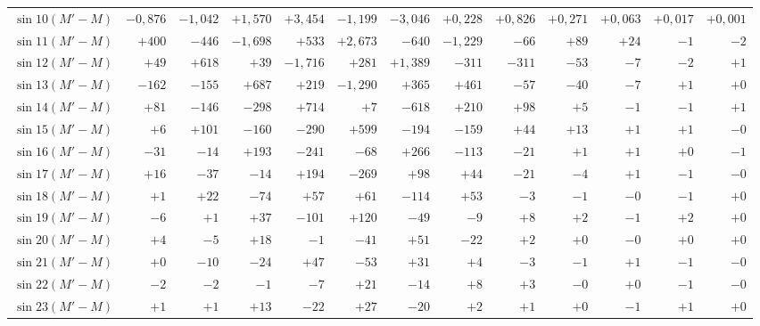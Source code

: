 \begin{landscape}
\begin{longtable}{@{}l|r|r|r|r|r|r|r|r|r|r|r|r@{}}
\(\sin 10(M'-M)\) & \(-0{,}876\) & \(-1{,}042\) & \(+1{,}570\) & \(+3{,}454\) & \(-1{,}199\) & \(-3{,}046\) & \(+0{,}228\) & \(+0{,}826\) & \(+0{,}271\) & \(+0{,}063\) & \(+0{,}017\) & \(+0{,}001\)\\
\(\sin 11(M'-M)\) & \(+400\) & \(-446\) & \(-1{,}698\) & \(+533\) & \(+2{,}673\) & \(-640\) & \(-1{,}229\) & \(-66\) & \(+89\) & \(+24\) & \(-1\) & \(-2\)\\
\(\sin 12(M'-M)\) & \(+49\) & \(+618\) & \(+39\) & \(-1{,}716\) & \(+281\) & \(+1{,}389\) & \(-311\) & \(-311\) & \(-53\) & \(-7\) & \(-2\) & \(+1\)\\
\(\sin 13(M'-M)\) & \(-162\) & \(-155\) & \(+687\) & \(+219\) & \(-1{,}290\) & \(+365\) & \(+461\) & \(-57\) & \(-40\) & \(-7\) & \(+1\) & \(+0\)\\
\(\sin 14(M'-M)\) & \(+81\) & \(-146\) & \(-298\) & \(+714\) & \(+7\) & \(-618\) & \(+210\) & \(+98\) & \(+5\) & \(-1\) & \(-1\) & \(+1\)\\
\(\sin 15(M'-M)\) & \(+6\) & \(+101\) & \(-160\) & \(-290\) & \(+599\) & \(-194\) & \(-159\) & \(+44\) & \(+13\) & \(+1\) & \(+1\) & \(-0\)\\
\(\sin 16(M'-M)\) & \(-31\) & \(-14\) & \(+193\) & \(-241\) & \(-68\) & \(+266\) & \(-113\) & \(-21\) & \(+1\) & \(+1\) & \(+0\) & \(-1\)\\
\(\sin 17(M'-M)\) & \(+16\) & \(-37\) & \(-14\) & \(+194\) & \(-269\) & \(+98\) & \(+44\) & \(-21\) & \(-4\) & \(+1\) & \(-1\) & \(-0\)\\
\(\sin 18(M'-M)\) & \(+1\) & \(+22\) & \(-74\) & \(+57\) & \(+61\) & \(-114\) & \(+53\) & \(-3\) & \(-1\) & \(-0\) & \(-1\) & \(+0\)\\
\(\sin 19(M'-M)\) & \(-6\) & \(+1\) & \(+37\) & \(-101\) & \(+120\) & \(-49\) & \(-9\) & \(+8\) & \(+2\) & \(-1\) & \(+2\) & \(+0\)\\
\(\sin 20(M'-M)\) & \(+4\) & \(-5\) & \(+18\) & \(-1\) & \(-41\) & \(+51\) & \(-22\) & \(+2\) & \(+0\) & \(-0\) & \(+0\) & \(+0\)\\
\(\sin 21(M'-M)\) & \(+0\) & \(-10\) & \(-24\) & \(+47\) & \(-53\) & \(+31\) & \(+4\) & \(-3\) & \(-1\) & \(+1\) & \(-1\) & \(-0\)\\
\(\sin 22(M'-M)\) & \(-2\) & \(-2\) & \(-1\) & \(-7\) & \(+21\) & \(-14\) & \(+8\) & \(+3\) & \(-0\) & \(+0\) & \(-1\) & \(-0\)\\
\(\sin 23(M'-M)\) & \(+1\) & \(+1\) & \(+13\) & \(-22\) & \(+27\) & \(-20\) & \(+2\) & \(+1\) & \(+0\) & \(-1\) & \(+1\) & \(+0\)\\
\end{longtable}
\clearpage
\endgroup
\endgroup
\end{landscape}
